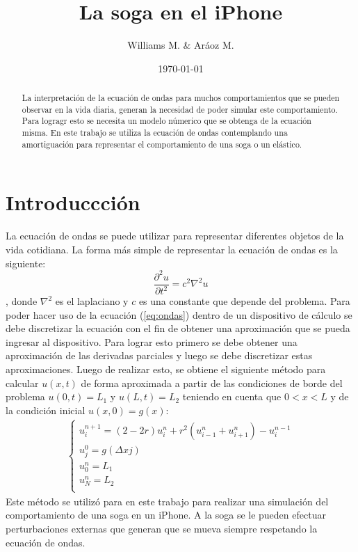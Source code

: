 \documentclass[11pt,a4paper]{emulateapj}
\begin{document}
\title{La soga en el iPhone}
\author{Williams M. \& Aráoz M.}
\date{\today}


\begin{abstract}
La interpretación de la ecuación de ondas para muchos comportamientos que se pueden observar en la vida diaria, generan la necesidad de poder simular este comportamiento. Para logragr esto se necesita un modelo númerico que se obtenga de la ecuación misma. En este trabajo se utiliza la ecuación de ondas contemplando una amortiguación para representar el comportamiento de una soga o un elástico. 
\end{abstract}

\maketitle




\section{Introduccción}
\label{sec:introduccion}
La ecuación de ondas se puede utilizar para representar diferentes objetos de la vida cotidiana. La forma más simple de representar la ecuación de ondas es la siguiente:
\begin{equation}
\label{eq:ondas}
\frac{\partial ^2 u}{\partial t^2} = c^2 \nabla ^2 u
\end{equation}
, donde $\nabla ^2$ es el laplaciano y $c$ es una constante que depende del problema. Para poder hacer uso de la ecuación (\ref{eq:ondas}) dentro de un dispositivo de cálculo se debe discretizar la ecuación con el fin de obtener una aproximación que se pueda ingresar al dispositivo. Para lograr esto primero se debe obtener una aproximación de las derivadas parciales y luego se debe discretizar estas aproximaciones. Luego de realizar esto, se obtiene el siguiente método para calcular $u(x,t)$ de forma aproximada a partir de las condiciones de borde del problema $u(0,t) = L_1$ y $u(L,t) = L_2$ teniendo en cuenta que $0 < x < L$ y de la condición inicial $u(x,0) = g(x)$:
\begin{eqnarray}
	\label{eq:metodoDeOndas}
	\left\{
		\begin{matrix}
			u_i^{n+1} = (2-2r) u_i^n + r^2 (u_{i-1}^n+u_{i+1}^n) - u_i^{n-1}\\
			u_j^0 = g(\Delta x j)\\
			u_0^n = L_1\\ 
			u_N^n = L_2\\
		\end{matrix} \right.
\end{eqnarray}
Este método se utilizó para en este trabajo para realizar una simulación del comportamiento de una soga en un iPhone. A la soga se le pueden efectuar perturbaciones externas que generan que se mueva siempre respetando la ecuación de ondas.
\end{document}
